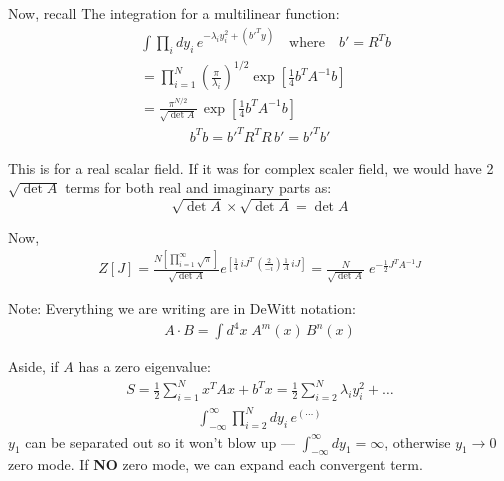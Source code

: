 \documentclass[14pt]{article} %
\begin{document}
Now, recall The integration for a multilinear function:
\begin{align*}
&\int \prod_{i} dy_i \, e^{-\lambda_i y_i^2 + (b'^T y)} 
\quad \text{where} \quad b' = R^T b
\\
&= \prod_{i=1}^N \left( \frac{\pi}{\lambda_i} \right)^{1/2} 
\exp\left[ \frac{1}{4} b^T A^{-1} b \right]
\\
&= \frac{\pi ^ {N/2}}{\sqrt{\det A}} \,\exp\left[ \frac{1}{4} b^T A^{-1} b \right]
\end{align*}
\begin{align*}
b^Tb = b'^T R^T R\, b' = b'^T b'
\end{align*}
\begin{tcolorbox}
This is for a real scalar field. If it was for complex scaler field, we would have 2 $\sqrt{\det A}$ terms for both real and imaginary parts as: 
$$\sqrt{\det A} \times\sqrt{\det A} = \det A$$
\end{tcolorbox}
Now,
\begin{align*}
Z[J] = \frac{N \left[ \prod_{i=1}^\infty \sqrt{\pi} \right]}{\sqrt{\det A}}
e^{ \left[ \frac14 \,iJ^T\, \left( \frac{2}{-i} \right) \frac1A \,iJ \right] }
= \frac{N}{\sqrt{\det A}} \;
e^{ -\frac12 J^T A^{-1} J }
\end{align*}
\begin{tcolorbox}
Note: Everything we are writing are in DeWitt notation:
\begin{align*}
A \cdot B = \int d^4x \; A^m(x) \, B^n(x)
\end{align*} 
\end{tcolorbox}
Aside, if $A$ has a zero eigenvalue:
\begin{align*}
S = \frac12 \sum_{i=1}^N x^T A x + b^T x
= \frac12 \sum_{i=2}^N \lambda_i y_i^2 + \dots
\end{align*}
\begin{align*}
\int_{-\infty}^\infty \prod_{i=2}^N dy_i \, e^{(\cdots)}
\end{align*}
$y_1$ can be separated out so it won't blow up — $\int_{-\infty}^\infty dy_1 = \infty$, otherwise $y_1 \to 0$ zero mode.  
If \textbf{NO} zero mode, we can expand each convergent term.
\\
\end{document}
